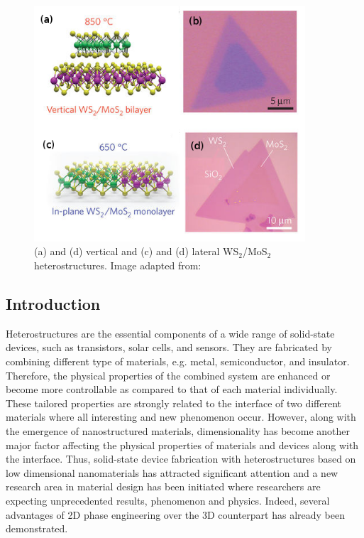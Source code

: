 \begin{figure}[htbp]
\centering
\includegraphics[width=0.9\textwidth]{ver-lat-stru.png}
\caption{ (a) and (d) vertical and (c) and (d) lateral WS$_2$/MoS$_2$ heterostructures. \label{fig:ver-lat-stru} Image adapted from: \cite{Gong_Lin2014}}
\end{figure}

\subsection{Introduction}
Heterostructures are the essential components of a wide range of solid-state devices, such as transistors, solar cells, and sensors\cite{singh1993,agostini2011}. They are  fabricated by combining different type of materials, e.g. metal, semiconductor, and insulator. Therefore, the physical properties of the combined system are enhanced or become more controllable as compared to that of each material individually. These tailored properties are strongly related to the interface of two different materials where all interesting and new phenomenon occur. However, along with the emergence of nanostructured materials, dimensionality has become another major factor affecting the physical properties of materials and devices along with the interface. Thus, solid-state device fabrication with heterostructures based on low dimensional nanomaterials has attracted significant attention and a new research area in material design has been initiated where researchers are expecting unprecedented results, phenomenon and physics\cite{Gan2013,Wu2015c,DiBartolomeo2016}. Indeed, several advantages of 2D phase engineering over the 3D counterpart has already been demonstrated.\cite{Duerloo2015}

